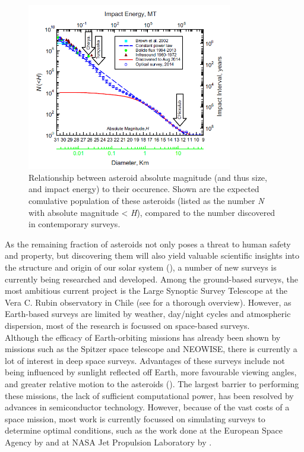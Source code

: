 \documentclass[12pt, english, NoHyper]{AE4010-template}
\begin{document}
\begin{figure}[thb]
 \centering
 \includegraphics[width=0.8\textwidth]{figures/populationdifference.png}
 \caption{Relationship between asteroid absolute magnitude (and thus size, and impact energy) to their occurence. Shown are the expected comulative population of these asteroids (listed as the number \textit{N} with absolute magnitude < \textit{H}), compared to the number discovered in contemporary surveys. \cite{PopulationHarris}}
 \label{fig:populationdifference}
\end{figure}

As the remaining fraction of asteroids not only poses a threat to human safety and property, but discovering them will also yield valuable scientific insights into the structure and origin of our solar system (\cite{Populations}), a number of new surveys is currently being researched and developed. Among the ground-based surveys, the most ambitious current project is the Large Synoptic Survey Telescope at the Vera C. Rubin observatory in Chile (see \cite{LSST} for a thorough overview). However, as Earth-based surveys are limited by weather, day/night cycles and atmospheric dispersion, most of the research is focussed on space-based surveys. \\

Although the efficacy of Earth-orbiting missions has already been shown by missions such as the Spitzer space telescope and NEOWISE, there is currently a lot of interest in deep space surveys. Advantages of these surveys include not being influenced by sunlight reflected off Earth, more favourable viewing angles, and greater relative motion to the asteroids (\cite{NEOSDT1}). The largest barrier to performing these missions, the lack of sufficient computational power, has been resolved by advances in semiconductor technology. However, because of the vast costs of a space mission, most work is currently focussed on simulating surveys to determine optimal conditions, such as the work done at the European Space Agency by \cite{Flyeye} and at NASA Jet Propulsion Laboratory by \cite{NEOSDT2}. \\
\end{document}
